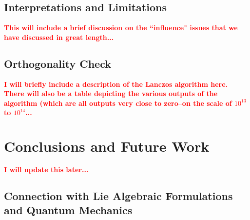 \documentclass[final,1p,times]{elsarticle}
\newcommand{\no}{\noindent}
\theoremstyle{remark}
\theoremstyle{definition}
\newcommand{\josh}[1]{\textcolor{red}{\textbf{#1}}}
\begin{document}


\subsection{Interpretations and Limitations}

\no\josh{This will include a brief discussion on the ``influence" issues that we have discussed in great length...}

\subsection{Orthogonality Check}

\no\josh{I will briefly include a description of the Lanczos algorithm here. There will also be a table depicting the various outputs of the algorithm (which are all outputs very close to zero--on the scale of $10^{13}$ to $10^{14}$...}

\section{Conclusions and Future Work}

\noindent\josh{I will update this later...}

\subsection{Connection with Lie Algebraic Formulations and Quantum Mechanics}

\end{document}

